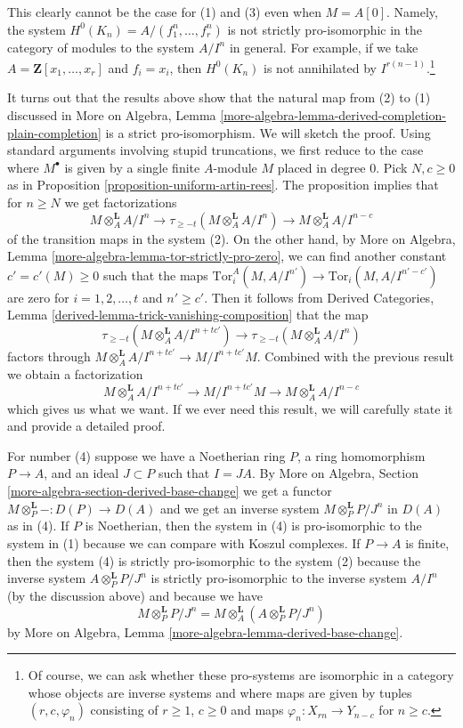 \begin{remark}
\medskip\noindent
This clearly cannot be the case for (1) and (3) even when $M = A[0]$.
Namely, the system $H^0(K_n) = A/(f_1^n, \ldots, f_r^n)$ is not strictly
pro-isomorphic in the category of modules to the system $A/I^n$ in general.
For example, if we take $A = \mathbf{Z}[x_1, \ldots, x_r]$ and $f_i = x_i$,
then $H^0(K_n)$ is not annihilated by $I^{r(n - 1)}$.\footnote{Of
course, we can ask whether these pro-systems are isomorphic in
a category whose objects are inverse systems and where maps are given
by tuples $(r, c, \varphi_n)$ consisting of $r \geq 1$, $c \geq 0$
and maps $\varphi_n : X_{rn} \to Y_{n - c}$ for $n \geq c$.}

\medskip\noindent
It turns out that the results above show that the natural map from
(2) to (1) discussed in More on Algebra, Lemma
\ref{more-algebra-lemma-derived-completion-plain-completion}
is a strict pro-isomorphism. We will sketch the proof.
Using standard arguments involving stupid truncations, we first reduce
to the case where $M^\bullet$ is given by a single finite $A$-module
$M$ placed in degree $0$. Pick $N, c \geq 0$ as in
Proposition \ref{proposition-uniform-artin-rees}.
The proposition implies that for $n \geq N$ we get factorizations
$$
M \otimes_A^\mathbf{L} A/I^n
\to
\tau_{\geq -t}(M \otimes_A^\mathbf{L} A/I^n)
\to
M \otimes_A^\mathbf{L} A/I^{n - c}
$$
of the transition maps in the system (2). On the other hand, by
More on Algebra, Lemma \ref{more-algebra-lemma-tor-strictly-pro-zero},
we can find another constant $c' = c'(M) \geq 0$ such that the maps
$\text{Tor}_i^A(M, A/I^{n'}) \to \text{Tor}_i(M, A/I^{n' - c'})$
are zero for $i = 1, 2, \ldots, t$ and $n' \geq c'$. Then it follows from
Derived Categories, Lemma \ref{derived-lemma-trick-vanishing-composition}
that the map
$$
\tau_{\geq -t}(M \otimes_A^\mathbf{L} A/I^{n + tc'})
\to
\tau_{\geq -t}(M \otimes_A^\mathbf{L} A/I^n)
$$
factors through $M \otimes_A^\mathbf{L}A/I^{n + tc'} \to M/I^{n + tc'}M$.
Combined with the previous result we obtain a factorization
$$
M \otimes_A^\mathbf{L}A/I^{n + tc'} \to M/I^{n + tc'}M
\to M \otimes_A^\mathbf{L} A/I^{n - c}
$$
which gives us what we want. If we ever need this result, we will carefully
state it and provide a detailed proof.

\medskip\noindent
For number (4) suppose we have a Noetherian ring $P$,
a ring homomorphism $P \to A$, and an ideal $J \subset P$ such that $I = JA$.
By More on Algebra, Section \ref{more-algebra-section-derived-base-change}
we get a functor $M \otimes_P^\mathbf{L} - : D(P) \to D(A)$ and we get
an inverse system $M \otimes_P^\mathbf{L} P/J^n$ in $D(A)$ as in (4).
If $P$ is Noetherian, then the system in (4) is pro-isomorphic
to the system in (1) because we can compare with Koszul complexes.
If $P \to A$ is finite, then the system (4) is strictly pro-isomorphic
to the system (2) because the inverse system $A \otimes_P^\mathbf{L} P/J^n$
is strictly pro-isomorphic to the inverse system $A/I^n$
(by the discussion above) and because we have
$$
M \otimes_P^\mathbf{L} P/J^n = M \otimes_A^\mathbf{L}
(A \otimes_P^\mathbf{L} P/J^n)
$$
by More on Algebra, Lemma \ref{more-algebra-lemma-derived-base-change}.


\end{remark}

